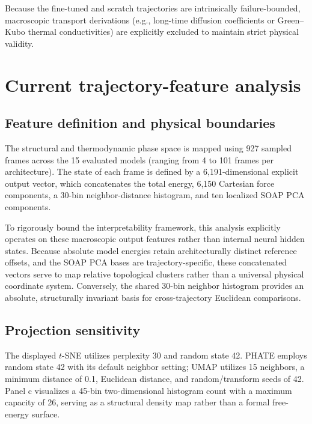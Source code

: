 \documentclass[pdflatex,sn-mathphys-num]{sn-jnl}
\begin{document}
Because the fine-tuned and scratch trajectories are intrinsically failure-bounded, macroscopic transport derivations (e.g., long-time diffusion coefficients or Green--Kubo thermal conductivities) are explicitly excluded to maintain strict physical validity.

\section{Current trajectory-feature analysis}\label{sec:representation}
\subsection{Feature definition and physical boundaries}
The structural and thermodynamic phase space is mapped using 927 sampled frames across the 15 evaluated models (ranging from 4 to 101 frames per architecture). The state of each frame is defined by a 6,191-dimensional explicit output vector, which concatenates the total energy, 6,150 Cartesian force components, a 30-bin neighbor-distance histogram, and ten localized SOAP PCA components.

To rigorously bound the interpretability framework, this analysis explicitly operates on these macroscopic output features rather than internal neural hidden states. Because absolute model energies retain architecturally distinct reference offsets, and the SOAP PCA bases are trajectory-specific, these concatenated vectors serve to map relative topological clusters rather than a universal physical coordinate system. Conversely, the shared 30-bin neighbor histogram provides an absolute, structurally invariant basis for cross-trajectory Euclidean comparisons.

\begin{table}[htbp]
\centering\small
\caption{\textbf{Original-space topological metrics for the 927-frame ensemble.} Silhouette labels correspond to the 15 model identities visualized in the main text. Standardization applies column-wise z-scoring across the aggregate diagnostic sample to normalize explicit feature scales. The invariant neighbor-distance bins isolate structural separation independently of the trajectory-specific PCA bases. Scores quantify topological clustering within the explicitly sampled population horizons.}
\label{tab:current_original_space}
\resizebox{\textwidth}{!}{}
\end{table}
\subsection{Projection sensitivity}
The displayed $t$-SNE utilizes perplexity 30 and random state 42. PHATE employs random state 42 with its default neighbor setting; UMAP utilizes 15 neighbors, a minimum distance of 0.1, Euclidean distance, and random/transform seeds of 42. Panel c visualizes a 45-bin two-dimensional histogram count with a maximum capacity of 26, serving as a structural density map rather than a formal free-energy surface.
\end{document}
